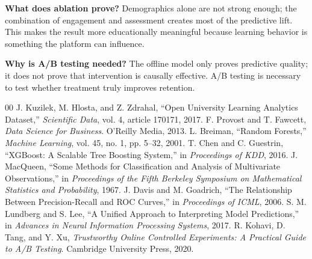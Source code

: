 \documentclass[conference]{IEEEtran}
\begin{document}
\textbf{What does ablation prove?} Demographics alone are not strong enough; the combination of engagement and assessment creates most of the predictive lift. This makes the result more educationally meaningful because learning behavior is something the platform can influence.

\textbf{Why is A/B testing needed?} The offline model only proves predictive quality; it does not prove that intervention is causally effective. A/B testing is necessary to test whether treatment truly improves retention.

\begin{thebibliography}{00}
 J. Kuzilek, M. Hlosta, and Z. Zdrahal, ``Open University Learning Analytics Dataset,'' \textit{Scientific Data}, vol. 4, article 170171, 2017.
 F. Provost and T. Fawcett, \textit{Data Science for Business}. O'Reilly Media, 2013.
 L. Breiman, ``Random Forests,'' \textit{Machine Learning}, vol. 45, no. 1, pp. 5--32, 2001.
 T. Chen and C. Guestrin, ``XGBoost: A Scalable Tree Boosting System,'' in \textit{Proceedings of KDD}, 2016.
 J. MacQueen, ``Some Methods for Classification and Analysis of Multivariate Observations,'' in \textit{Proceedings of the Fifth Berkeley Symposium on Mathematical Statistics and Probability}, 1967.
 J. Davis and M. Goadrich, ``The Relationship Between Precision-Recall and ROC Curves,'' in \textit{Proceedings of ICML}, 2006.
 S. M. Lundberg and S. Lee, ``A Unified Approach to Interpreting Model Predictions,'' in \textit{Advances in Neural Information Processing Systems}, 2017.
 R. Kohavi, D. Tang, and Y. Xu, \textit{Trustworthy Online Controlled Experiments: A Practical Guide to A/B Testing}. Cambridge University Press, 2020.
\end{thebibliography}

\balance
\end{document}
